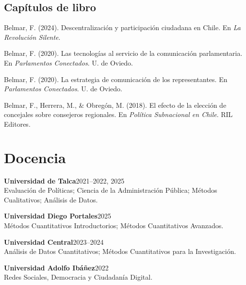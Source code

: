 \documentclass[11pt,a4paper]{article}
\newcommand{\cvitem}[2]{\noindent\textbf{#1}\hfill #2\\[2pt]}
\newcommand{\cvdetail}[1]{\noindent\hspace{0.3cm}#1\par\vspace{4pt}}
\begin{document}
\subsection*{Capítulos de libro}

\begin{enumerate}[leftmargin=*, label={[\arabic*]}]
    \item Belmar, F. (2024). Descentralización y participación ciudadana en Chile. En \textit{La Revolución Silente}.

    \item Belmar, F. (2020). Las tecnologías al servicio de la comunicación parlamentaria. En \textit{Parlamentos Conectados}. U. de Oviedo.

    \item Belmar, F. (2020). La estrategia de comunicación de los representantes. En \textit{Parlamentos Conectados}. U. de Oviedo.

    \item Belmar, F., Herrera, M., \& Obregón, M. (2018). El efecto de la elección de concejales sobre consejeros regionales. En \textit{Política Subnacional en Chile}. RIL Editores.
\end{enumerate}

\section{Docencia}

\cvitem{Universidad de Talca}{2021--2022, 2025}
\cvdetail{Evaluación de Políticas; Ciencia de la Administración Pública; Métodos Cualitativos; Análisis de Datos.}

\vspace{4pt}

\cvitem{Universidad Diego Portales}{2025}
\cvdetail{Métodos Cuantitativos Introductorios; Métodos Cuantitativos Avanzados.}

\vspace{4pt}

\cvitem{Universidad Central}{2023--2024}
\cvdetail{Análisis de Datos Cuantitativos; Métodos Cuantitativos para la Investigación.}

\vspace{4pt}

\cvitem{Universidad Adolfo Ibáñez}{2022}
\cvdetail{Redes Sociales, Democracia y Ciudadanía Digital.}

\end{document}
